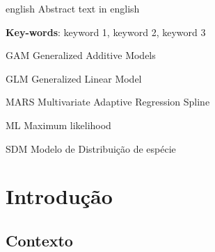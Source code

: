 \documentclass[
	12pt,				%
	openright,			%
	oneside,			%
	a4paper,			%
	english,			%
	brazil				%
	]{abntex2}
\begin{document}
\begin{resumo}[Abstract]
 \begin{otherlanguage*}{english}
    Abstract text in english
   
   \textbf{Key-words}: keyword 1, keyword 2, keyword 3
 \end{otherlanguage*}
\end{resumo}

\listoffigures*
\cleardoublepage

\listoftables*
\cleardoublepage

\begin{siglas}
  \item[GAM] Generalized Additive Models
  \item[GLM] Generalized Linear Model
  \item[MARS] Multivariate Adaptive Regression Spline
  \item[ML] Maximum likelihood
  \item[SDM] Modelo de Distribuição de espécie
\end{siglas}

\tableofcontents*
\cleardoublepage

\textual
\chapter{Introdução}

\section{Contexto}
\end{document}
